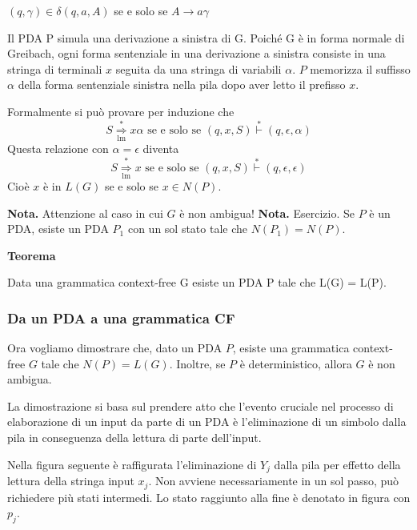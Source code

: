 \begin{center}
    $(q, \gamma) \in \delta(q, a, A)$ se e solo se $A \rightarrow a \gamma$
\end{center}


Il PDA P simula una derivazione a sinistra di G. Poiché G è in forma normale di Greibach, ogni forma sentenziale in una derivazione a sinistra consiste in una stringa di terminali $x$ seguita da una stringa di variabili $\alpha$.
$P$ memorizza il suffisso $\alpha$ della forma sentenziale sinistra nella pila dopo aver letto il prefisso $x$.

\vspace{5mm}

Formalmente si può provare per induzione che
$$
S \underset{\operatorname{lm}}{\stackrel{*}{\Rightarrow}} x \alpha \text { se e solo se }(q, x, S) \stackrel{*}{\vdash}(q, \epsilon, \alpha)
$$
Questa relazione con $\alpha=\epsilon$ diventa
$$
S \underset{\operatorname{lm}}{\stackrel{*}{\Rightarrow}} x \text { se e solo se }(q, x, S) \stackrel{*}{\vdash}(q, \epsilon, \epsilon)
$$
Cioè $x$ è in $L(G)$ se e solo se $x \in N(P)$.

\vspace{5mm}

\textbf{Nota.} Attenzione al caso in cui $G$ è non ambigua!
\textbf{Nota.} Esercizio. Se $P$ è un PDA, esiste un PDA $P_{1}$ con un sol stato tale che $N\left(P_{1}\right)=N(P)$.

\vspace{5mm}

\textbf{Teorema}

Data una grammatica context-free G esiste un PDA P tale che
L(G) = L(P).

\subsubsection{Da un PDA a una grammatica CF}
Ora vogliamo dimostrare che, dato un PDA $P$, esiste una grammatica context-free $G$ tale che $N(P)=L(G)$. Inoltre, se $P$ è deterministico, allora $G$ è non ambigua.

La dimostrazione si basa sul prendere atto che l'evento cruciale nel processo di elaborazione di un input da parte di un PDA è l'eliminazione di un simbolo dalla pila in conseguenza della lettura di parte dell'input.

\vspace{5mm}

Nella figura seguente è raffigurata l'eliminazione di $Y_{j}$ dalla pila per effetto della lettura della stringa input $x_{j}$. Non avviene necessariamente in un sol passo, può richiedere più stati intermedi. Lo stato raggiunto alla fine è denotato in figura con $p_{j}$.

